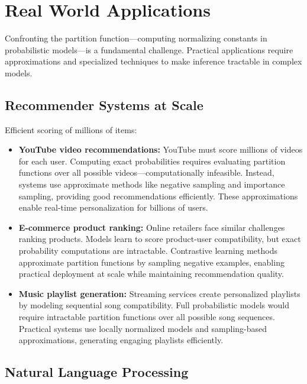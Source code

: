 
\section{Real World Applications}
\label{sec:partition-real-world}


Confronting the partition function—computing normalizing constants in probabilistic models—is a fundamental challenge. Practical applications require approximations and specialized techniques to make inference tractable in complex models.

\subsection{Recommender Systems at Scale}

Efficient scoring of millions of items:

\begin{itemize}
    \item \textbf{YouTube video recommendations:} YouTube must score millions of videos for each user. Computing exact probabilities requires evaluating partition functions over all possible videos—computationally infeasible. Instead, systems use approximate methods like negative sampling and importance sampling, providing good recommendations efficiently. These approximations enable real-time personalization for billions of users.
    
    \item \textbf{E-commerce product ranking:} Online retailers face similar challenges ranking products. Models learn to score product-user compatibility, but exact probability computations are intractable. Contrastive learning methods approximate partition functions by sampling negative examples, enabling practical deployment at scale while maintaining recommendation quality.
    
    \item \textbf{Music playlist generation:} Streaming services create personalized playlists by modeling sequential song compatibility. Full probabilistic models would require intractable partition functions over all possible song sequences. Practical systems use locally normalized models and sampling-based approximations, generating engaging playlists efficiently.
\end{itemize}

\subsection{Natural Language Processing}


